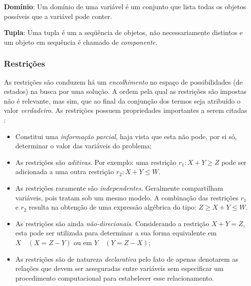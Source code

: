 \textbf{Domínio}: Um domínio de uma variável é um conjunto que lista todas os objetos possíveis que a variável pode conter.

\textbf{Tupla}: Uma tupla é um a seqüência de objetos, não necessariamente distintos e um objeto em sequência é chamado de \textit{componente}.




\subsubsection{Restrições}
\label{sec:restr}

As restrições são conduzem há um \textit{encolhimento}  no espaço de possibilidades (de estados) na busca por uma solução. A ordem pela qual as restrições são impostas não é relevante, mas sim, que ao final da conjunção dos termos seja atribuído o valor \textit{verdadeiro}. As restrições possuem propriedades importantes a serem citadas \cite{sucupira_03}:

\begin{itemize}
	\item Constitui uma \textit{informação parcial}, haja vista que esta não pode, por si só, determinar o valor das variáveis do problema;

	\item As restrições são \textit{aditivas}. Por exemplo: uma restrição $r_{1}: X + Y \geq Z $ pode ser adicionada a uma outra restrição $r_{2}: X + Y \leq W $.

	\item As restrições raramente são \textit{independentes}. Geralmente compartilham variáveis, pois tratam sob um mesmo modelo. A combinação das restrições $r_{1}$ e $r_{2}$ resulta na obtenção de uma expressão algébrica do tipo: $Z \geq X + Y \leq W$.

	\item As restrições são ainda \textit{não-direcionais}. Considerando a restrição $X + Y = Z$, esta pode ser utilizada para determinar a sua forma equivalente em $X \quad (X = Z - Y)$ ou em $Y \quad (Y = Z - X)$;

	\item As restrições são de natureza \textit{declarativa} pelo fato de apenas denotarem as relações que devem ser asseguradas entre variáveis sem especificar um procedimento computacional para  estabelecer esse relacionamento.
\end{itemize}


